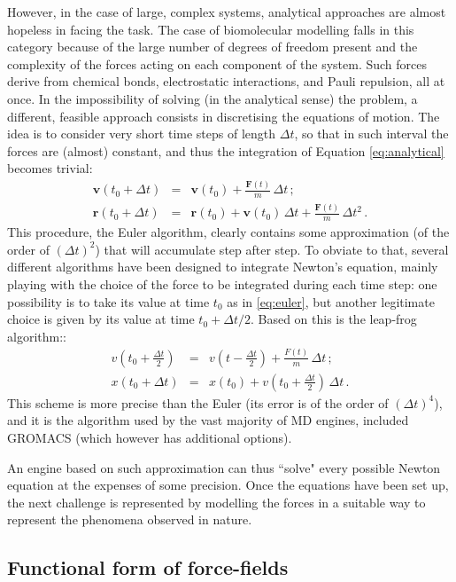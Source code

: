 However, in the case of large, complex systems, analytical approaches are almost hopeless in facing the task. The case of biomolecular modelling falls in this category because of the large number of degrees of freedom present and the complexity of the forces acting on each component of the system. Such forces derive from chemical bonds, electrostatic interactions, and Pauli repulsion, all at once. In the impossibility of solving (in the analytical sense) the problem, a different, feasible approach consists in discretising the equations of motion. The idea is to consider very short time steps of length $\Delta t$, so that in such interval the forces are (almost) constant, and thus the integration of Equation \ref{eq:analytical} becomes trivial:
\begin{eqnarray} \label{eq:euler}
\mathbf{v}(t_0 + \Delta t) &=& \mathbf{v}(t_0) + \frac{\mathbf{F}(t)}{m} \, \Delta t \,; \\
\mathbf{r}(t_0 + \Delta t) &=& \mathbf{r}(t_0) + \mathbf{v}(t_0) \, \Delta t + \frac{\mathbf{F}(t)}{m} \, \Delta t^2 \,.
\end{eqnarray}
This procedure, the Euler algorithm, clearly contains some approximation (of the order of $(\Delta t)^2$) that will accumulate step after step. To obviate to that, several different algorithms have been designed to integrate Newton's equation, mainly playing with the choice of the force to be integrated during each time step: one possibility is to take its value at time $t_0$ as in \ref{eq:euler}, but another legitimate choice is given by its value at time $t_0 + \Delta t/2$. Based on this is the leap-frog algorithm::
\begin{eqnarray}
v\left(t_0 + \frac{\Delta t}{2}\right) &=& v\left(t - \frac{\Delta t}{2}\right) + \frac{F(t)}{m} \, \Delta t \, ; \\
x(t_0 + \Delta t) &=& x(t_0) + v\left(t_0 + \frac{\Delta t}{2}\right) \, \Delta t \, .
\end{eqnarray}
This scheme is more precise than the Euler (its error is of the order of $(\Delta t)^4$), and it is the algorithm used by the vast majority of MD engines, included GROMACS (which however has additional options).

An engine based on such approximation can thus ``solve" every possible Newton equation at the expenses of some precision. Once the equations have been set up, the next challenge is represented by modelling the forces in a suitable way to represent the phenomena observed in nature.


\subsection{Functional form of force-fields} \label{sec:ff}

